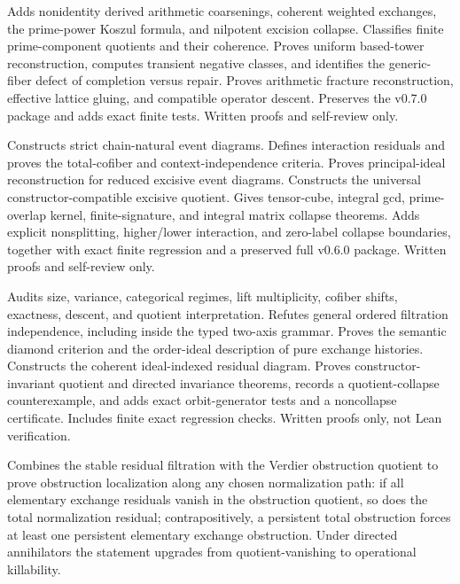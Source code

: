 \documentclass[11pt]{article}
\theoremstyle{definition}
\theoremstyle{remark}
\begin{document}
\begingroup\small\raggedright
\begin{description}[leftmargin=8em,style=nextline]
\item[v0.8.0] Adds nonidentity derived arithmetic coarsenings, coherent weighted exchanges, the prime-power Koszul formula, and nilpotent excision collapse. Classifies finite prime-component quotients and their coherence. Proves uniform based-tower reconstruction, computes transient negative classes, and identifies the generic-fiber defect of completion versus repair. Proves arithmetic fracture reconstruction, effective lattice gluing, and compatible operator descent. Preserves the v0.7.0 package and adds exact finite tests. Written proofs and self-review only.
\item[v0.7.0] Constructs strict chain-natural event diagrams. Defines interaction residuals and proves the total-cofiber and context-independence criteria. Proves principal-ideal reconstruction for reduced excisive event diagrams. Constructs the universal constructor-compatible excisive quotient. Gives tensor-cube, integral gcd, prime-overlap kernel, finite-signature, and integral matrix collapse theorems. Adds explicit nonsplitting, higher/lower interaction, and zero-label collapse boundaries, together with exact finite regression and a preserved full v0.6.0 package. Written proofs and self-review only.
\item[v0.6.0] Audits size, variance, categorical regimes, lift multiplicity, cofiber shifts, exactness, descent, and quotient interpretation. Refutes general ordered filtration independence, including inside the typed two-axis grammar. Proves the semantic diamond criterion and the order-ideal description of pure exchange histories. Constructs the coherent ideal-indexed residual diagram. Proves constructor-invariant quotient and directed invariance theorems, records a quotient-collapse counterexample, and adds exact orbit-generator tests and a noncollapse certificate. Includes finite exact regression checks. Written proofs only, not Lean verification.
\item[v0.5.0] Combines the stable residual filtration with the Verdier obstruction quotient to prove obstruction localization along any chosen normalization path: if all elementary exchange residuals vanish in the obstruction quotient, so does the total normalization residual; contrapositively, a persistent total obstruction forces at least one persistent elementary exchange obstruction. Under directed annihilators the statement upgrades from quotient-vanishing to operational killability.

\end{description}
\end{document}
